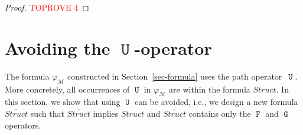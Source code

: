 \documentclass[a4paper,UKenglish,cleveref, autoref, thm-restate]{lipics-v2021}
\newcommand{\M}{\mathcal{M}}
\newcommand{\Struct}{\textit{Struct}}
\newcommand*{\opu}{\operatorname{\pmb{\mathtt{U}}}}
\newcommand*{\opf}{\operatorname{\pmb{\mathtt{F}}}}
\newcommand*{\opg}{\operatorname{\pmb{\mathtt{G}}}}
\begin{document}
\outlineseg*
\begin{proof}\textcolor{red}{TOPROVE 4}\end{proof}
 







































































\section{Avoiding the $\opu$-operator}
\label{sec-U-avoid}

The formula $\varphi_\M$ constructed in Section~\ref{sec-formula} uses the path operator~$\opu$. More concretely, all occurrences of $\opu$ in $\varphi_\M$ are within the formula $\Struct$. In this section, we show that using $\opu$ can be avoided, i.e., we design a new formula $\overline{\Struct}$ such that $\overline{\Struct}$ implies $\Struct$ and $\overline{\Struct}$ contains only the $\opf$ and $\opg$ operators.
\end{document}
